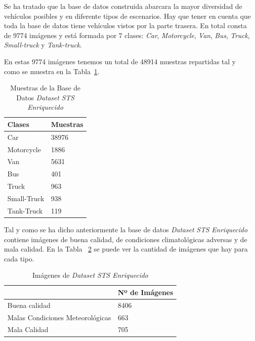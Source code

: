 Se ha tratado que la base de datos construida abarcara la mayor diversidad de vehículos posibles y en diferente tipos de escenarios. Hay que tener en cuenta que toda la base de datos tiene vehículos vistos por la parte trasera. En total consta de 9774 imágenes y está formada por 7 clases: \textit{Car}, \textit{Motorcycle}, \textit{Van}, \textit{Bus}, \textit{Truck}, \textit{Small-truck} y \textit{Tank-truck}.


En estas 9774 imágenes tenemos un total de 48914 muestras repartidas tal y como se muestra en la Tabla~\ref{tabla_muestras}.

\begin{table}[htbp] 
\begin{center}
\begin{tabular}{|l|l|}
\hline
Clases & Muestras \\
\hline \hline
Car & 38976 \\ \hline
Motorcycle & 1886 \\ \hline
Van & 5631 \\ \hline
Bus & 401 \\ \hline
Truck & 963 \\ \hline
Small-Truck & 938 \\ \hline
Tank-Truck & 119 \\ \hline
\end{tabular}
\caption{Muestras de la Base de Datos \textit{Dataset STS Enriquecido}}
\label{tabla_muestras}
\end{center}
\end{table}

Tal y como se ha dicho anteriormente la base de datos \textit{Dataset STS Enriquecido} contiene imágenes de buena calidad, de condiciones climatológicas adversas y de mala calidad. En la Tabla ~\ref{tabla_img_base_datos} se puede ver la cantidad de imágenes que hay para cada tipo.

\begin{table}[htb]
\begin{center}
\begin{tabular}{|l|l|}
\hline
\cline{2-2}& Nº de Imágenes\\
\hline \hline
Buena calidad & 8406 \\ \hline
Malas Condiciones Meteorológicas & 663\\ \hline
Mala Calidad & 705\\ \hline
\end{tabular}
\caption{Imágenes de \textit{Dataset STS Enriquecido}}
\label{tabla_img_base_datos}
\end{center}
\end{table}

